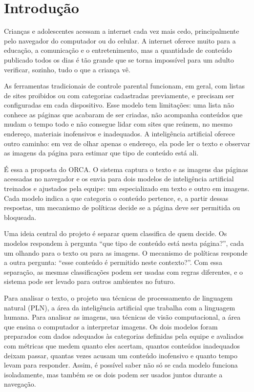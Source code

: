 \documentclass[
    12pt,           %
    oneside,        %
    a4paper,        %
    chapter=TITLE,  %
    english,        %
    brazil          %
]{abntex2}
\begin{document}
\chapter{Introdução}

Crianças e adolescentes acessam a internet cada vez mais cedo, principalmente
pelo navegador do computador ou do celular. A internet oferece muito para a
educação, a comunicação e o entretenimento, mas a quantidade de conteúdo
publicado todos os dias é tão grande que se torna impossível para um adulto
verificar, sozinho, tudo o que a criança vê.

As ferramentas tradicionais de controle parental funcionam, em geral, com
listas de sites proibidos ou com categorias cadastradas previamente, e
precisam ser configuradas em cada dispositivo. Esse modelo tem limitações:
uma lista não conhece as páginas que acabaram de ser criadas, não acompanha
conteúdos que mudam o tempo todo e não consegue lidar com sites que reúnem,
no mesmo endereço, materiais inofensivos e inadequados. A inteligência
artificial oferece outro caminho: em vez de olhar apenas o endereço, ela pode
ler o texto e observar as imagens da página para estimar que tipo de conteúdo
está ali.

É essa a proposta do ORCA. O sistema captura o texto e as
imagens das páginas acessadas no navegador e os envia para dois modelos de
inteligência artificial treinados e ajustados pela equipe: um especializado
em texto e outro em imagens. Cada modelo indica a que categoria o conteúdo
pertence, e, a partir dessas respostas, um mecanismo de políticas decide se a
página deve ser permitida ou bloqueada.

Uma ideia central do projeto é separar quem classifica de quem decide. Os
modelos respondem à pergunta ``que tipo de conteúdo está nesta página?'',
cada um olhando para o texto ou para as imagens. O mecanismo de políticas
responde a outra pergunta: ``esse conteúdo é permitido neste contexto?''.
Com essa separação, as mesmas classificações podem ser usadas com regras
diferentes, e o sistema pode ser levado para outros ambientes no futuro.

Para analisar o texto, o projeto usa técnicas de processamento de linguagem
natural (PLN), a área da inteligência artificial que trabalha com a linguagem
humana. Para analisar as imagens, usa técnicas de visão computacional, a área
que ensina o computador a interpretar imagens. Os dois modelos foram
preparados com dados adequados às categorias definidas pela equipe e
avaliados com métricas que medem quanto eles acertam, quantos conteúdos
inadequados deixam passar, quantas vezes acusam um conteúdo inofensivo e
quanto tempo levam para responder. Assim, é possível saber não só se cada
modelo funciona isoladamente, mas também se os dois podem ser usados juntos
durante a navegação.
\end{document}
